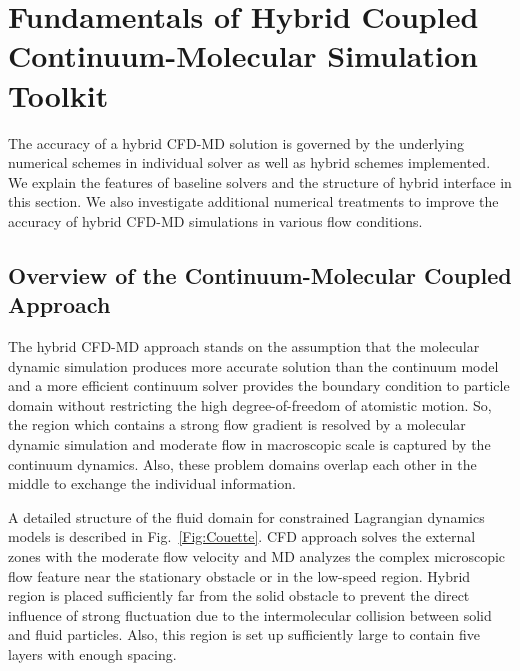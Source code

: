\documentclass[preprint,12pt]{elsarticle}
\begin{document}
\section{Fundamentals of Hybrid Coupled Continuum-Molecular Simulation Toolkit}

The accuracy of a hybrid CFD-MD solution is governed by the underlying numerical schemes in individual solver as well as hybrid schemes implemented. We explain the features of baseline solvers and the structure of hybrid interface in this section. We also investigate additional numerical treatments to improve the accuracy of hybrid CFD-MD simulations in various flow conditions.

\subsection{Overview of the Continuum-Molecular Coupled Approach}
The hybrid CFD-MD approach stands on the assumption that the molecular dynamic simulation produces more accurate solution than the continuum model and a more efficient continuum solver provides the boundary condition to particle domain without restricting the high degree-of-freedom of atomistic motion. So, the region which contains a strong flow gradient is resolved by a molecular dynamic simulation and moderate flow in macroscopic scale is captured by the continuum dynamics. Also, these problem domains overlap each other in the middle to exchange the individual information.

A detailed structure of the fluid domain for constrained Lagrangian dynamics models is described in Fig.~\ref{Fig:Couette}. CFD approach solves the external zones with the moderate flow velocity and MD analyzes the complex microscopic flow feature near the stationary obstacle or in the low-speed region. Hybrid region is placed sufficiently far from the solid obstacle to prevent the direct influence of strong fluctuation due to the intermolecular collision between solid and fluid particles. Also, this region is set up sufficiently large to contain five layers with enough spacing.
\end{document}
